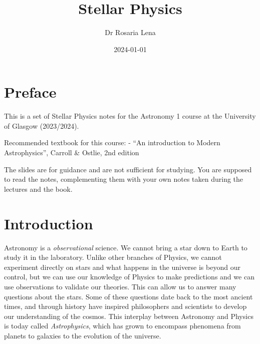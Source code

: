 \documentclass[
  letterpaper,
  DIV=11,
  numbers=noendperiod]{scrreprt}
\title{Stellar Physics}
\author{Dr Rosaria Lena}
\date{2024-01-01}
\renewcommand*\contentsname{Table of contents}
\newcommand\contentsname{Table of contents}
\begin{document}
\maketitle
\ifdefined\Shaded\renewenvironment{Shaded}{\begin{tcolorbox}[sharp corners, boxrule=0pt, interior hidden, breakable, frame hidden, enhanced, borderline west={3pt}{0pt}{shadecolor}]}{\end{tcolorbox}}\fi

\renewcommand*\contentsname{Table of contents}
{
\hypersetup{linkcolor=}
\setcounter{tocdepth}{2}
\tableofcontents
}

\hypertarget{preface}{%
\chapter*{Preface}\label{preface}}


This is a set of Stellar Physics notes for the Astronomy 1 course at the
University of Glasgow (2023/2024).

Recommended textbook for this course: - ``An introduction to Modern
Astrophysics'', Carroll \& Ostlie, 2nd edition

The slides are for guidance and are not sufficient for studying. You are
supposed to read the notes, complementing them with your own notes taken
during the lectures and the book.


\hypertarget{introduction}{%
\chapter*{Introduction}\label{introduction}}


Astronomy is a \emph{observational} science. We cannot bring a star down
to Earth to study it in the laboratory. Unlike other branches of
Physics, we cannot experiment directly on stars and what happens in the
universe is beyond our control, but we can use our knowledge of Physics
to make predictions and we can use observations to validate our
theories. This can allow us to answer many questions about the stars.
Some of these questions date back to the most ancient times, and through
history have inspired philosophers and scientists to develop our
understanding of the cosmos. This interplay between Astronomy and
Physics is today called \emph{Astrophysics}, which has grown to
encompass phenomena from planets to galaxies to the evolution of the
universe.
\end{document}
